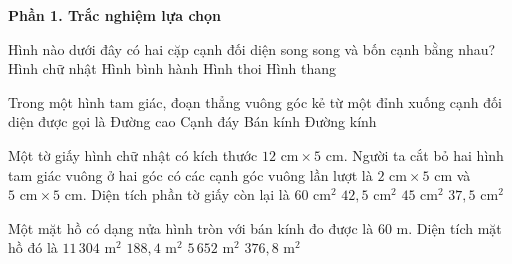 \textbf{Phần 1. Trắc nghiệm lựa chọn}

\begin{ex} %
Hình nào dưới đây có hai cặp cạnh đối diện song song và bốn cạnh bằng nhau?
\choice
{Hình chữ nhật}
{Hình bình hành}
{\True Hình thoi}
{Hình thang}
\end{ex}

\begin{ex} %
Trong một hình tam giác, đoạn thẳng vuông góc kẻ từ một đỉnh xuống cạnh đối diện được gọi là
\choice
{\True Đường cao}
{Cạnh đáy}
{Bán kính}
{Đường kính}
\end{ex}

\begin{ex} %
Một tờ giấy hình chữ nhật có kích thước $12\text{ cm} \times 5\text{ cm}$. Người ta cắt bỏ hai hình tam giác vuông ở hai góc có các cạnh góc vuông lần lượt là $2\text{ cm} \times 5\text{ cm}$ và $5\text{ cm} \times 5\text{ cm}$. Diện tích phần tờ giấy còn lại là
\choice
{$60\text{ cm}^2$}
{\True $42{,}5\text{ cm}^2$}
{$45\text{ cm}^2$}
{$37{,}5\text{ cm}^2$}
\end{ex}

\begin{ex} %
Một mặt hồ có dạng nửa hình tròn với bán kính đo được là $60\text{ m}$. Diện tích mặt hồ đó là
\choice
{$11\,304\text{ m}^2$}
{$188{,}4\text{ m}^2$}
{\True $5\,652\text{ m}^2$}
{$376{,}8\text{ m}^2$}
\end{ex}

